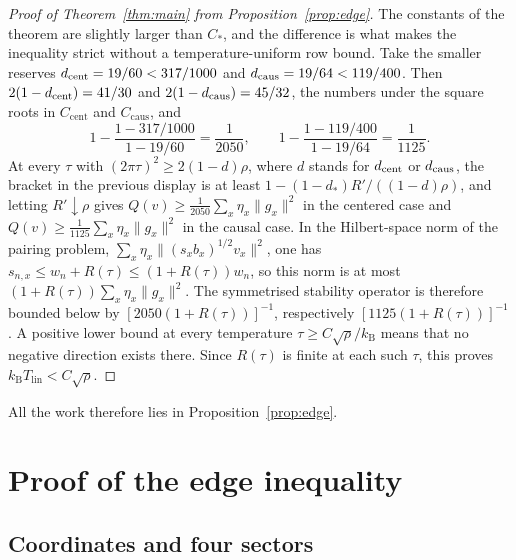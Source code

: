 \documentclass[10pt]{article}
\theoremstyle{remark}
\newcommand{\kB}{k_{\mathrm B}}
\newcommand{\Tlin}{T_{\mathrm{lin}}}
\newcommand{\Ccent}{C_{\mathrm{cent}}}
\newcommand{\Ccaus}{C_{\mathrm{caus}}}
\newcommand{\dstar}{d_{*}}
\begin{document}
\begin{proof}[Proof of Theorem~\ref{thm:main} from Proposition~\ref{prop:edge}]
The constants of the theorem are slightly larger than $C_*$, and the difference is what makes the inequality strict without a temperature-uniform row bound. Take the smaller reserves $d_{\rm cent}=19/60<317/1000$ and $d_{\rm caus}=19/64<119/400$. Then $2(1-d_{\rm cent})=41/30$ and $2(1-d_{\rm caus})=45/32$, the numbers under the square roots in $\Ccent$ and $\Ccaus$, and
\[
1-\frac{1-317/1000}{1-19/60}=\frac1{2050},\qquad
1-\frac{1-119/400}{1-19/64}=\frac1{1125}.
\]
At every $\tau$ with $(2\pi\tau)^2\ge2(1-d)\rho$, where $d$ stands for $d_{\rm cent}$ or $d_{\rm caus}$, the bracket in the previous display is at least $1-(1-\dstar)R'/((1-d)\rho)$, and letting $R'\downarrow\rho$ gives $Q(v)\ge\frac1{2050}\sum_x\eta_x\|g_x\|^2$ in the centered case and $Q(v)\ge\frac1{1125}\sum_x\eta_x\|g_x\|^2$ in the causal case. In the Hilbert-space norm of the pairing problem, $\sum_x\eta_x\|(s_xb_x)^{1/2}v_x\|^2$, one has $s_{n,x}\le w_n+R(\tau)\le(1+R(\tau))w_n$, so this norm is at most $(1+R(\tau))\sum_x\eta_x\|g_x\|^2$. The symmetrised stability operator is therefore bounded below by $[2050(1+R(\tau))]^{-1}$, respectively $[1125(1+R(\tau))]^{-1}$. A positive lower bound at every temperature $\tau\ge C\sqrt\rho/\kB$ means that no negative direction exists there. Since $R(\tau)$ is finite at each such $\tau$, this proves $\kB\Tlin<C\sqrt\rho$.
\end{proof}

All the work therefore lies in Proposition~\ref{prop:edge}.

\section{Proof of the edge inequality}\label{sec:proof}

\subsection{Coordinates and four sectors}
\end{document}
